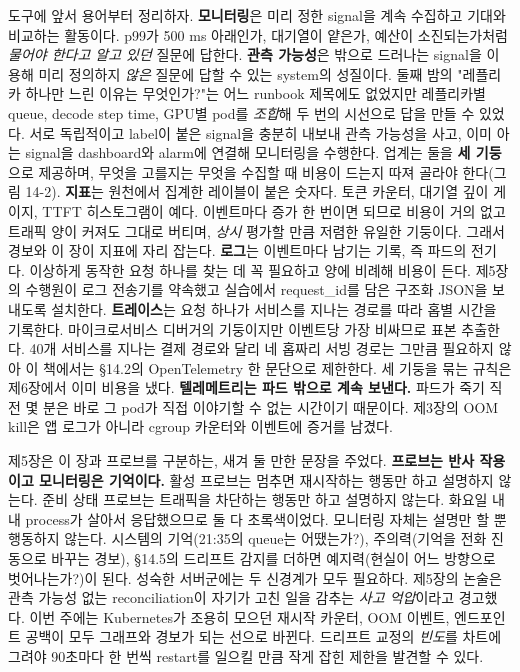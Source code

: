 도구에 앞서 용어부터 정리하자. \textbf{모니터링}은 미리 정한 signal을 계속 수집하고 기대와 비교하는 활동이다. p99가 500 ms 아래인가, 대기열이 얕은가, 예산이 소진되는가처럼 \textit{물어야 한다고 알고 있던} 질문에 답한다. \textbf{관측 가능성}은 밖으로 드러나는 signal을 이용해 미리 정의하지 \textit{않은} 질문에 답할 수 있는 system의 성질이다. 둘째 밤의 "레플리카 하나만 느린 이유는 무엇인가?"는 어느 runbook 제목에도 없었지만 레플리카별 queue, decode step time, GPU별 pod를 \textit{조합}해 두 번의 시선으로 답을 만들 수 있었다. 서로 독립적이고 label이 붙은 signal을 충분히 내보내 관측 가능성을 사고, 이미 아는 signal을 dashboard와 alarm에 연결해 모니터링을 수행한다. 업계는 둘을 \textbf{세 기둥}으로 제공하며, 무엇을 고를지는 무엇을 수집할 때 비용이 드는지 따져 골라야 한다(그림 14-2). \textbf{지표}는 원천에서 집계한 레이블이 붙은 숫자다. 토큰 카운터, 대기열 깊이 게이지, TTFT 히스토그램이 예다. 이벤트마다 증가 한 번이면 되므로 비용이 거의 없고 트래픽 양이 커져도 그대로 버티며, \textit{상시} 평가할 만큼 저렴한 유일한 기둥이다. 그래서 경보와 이 장이 지표에 자리 잡는다. \textbf{로그}는 이벤트마다 남기는 기록, 즉 파드의 전기다. 이상하게 동작한 요청 하나를 찾는 데 꼭 필요하고 양에 비례해 비용이 든다. 제5장의 수행원이 로그 전송기를 약속했고 실습에서 request\_id를 담은 구조화 JSON을 보내도록 설치한다. \textbf{트레이스}는 요청 하나가 서비스를 지나는 경로를 따라 홉별 시간을 기록한다. 마이크로서비스 디버거의 기둥이지만 이벤트당 가장 비싸므로 표본 추출한다. 40개 서비스를 지나는 결제 경로와 달리 네 홉짜리 서빙 경로는 그만큼 필요하지 않아 이 책에서는 §14.2의 OpenTelemetry 한 문단으로 제한한다. 세 기둥을 묶는 규칙은 제6장에서 이미 비용을 냈다. \textbf{텔레메트리는 파드 밖으로 계속 보낸다.} 파드가 죽기 직전 몇 분은 바로 그 pod가 직접 이야기할 수 없는 시간이기 때문이다. 제3장의 OOM kill은 앱 로그가 아니라 cgroup 카운터와 이벤트에 증거를 남겼다.

제5장은 이 장과 프로브를 구분하는, 새겨 둘 만한 문장을 주었다. \textbf{프로브는 반사 작용이고 모니터링은 기억이다.} 활성 프로브는 멈추면 재시작하는 행동만 하고 설명하지 않는다. 준비 상태 프로브는 트래픽을 차단하는 행동만 하고 설명하지 않는다. 화요일 내내 process가 살아서 응답했으므로 둘 다 초록색이었다. 모니터링 자체는 설명만 할 뿐 행동하지 않는다. 시스템의 기억(21:35의 queue는 어땠는가?), 주의력(기억을 전화 진동으로 바꾸는 경보), §14.5의 드리프트 감지를 더하면 예지력(현실이 어느 방향으로 벗어나는가?)이 된다. 성숙한 서버군에는 두 신경계가 모두 필요하다. 제5장의 논술은 관측 가능성 없는 reconciliation이 자기가 고친 일을 감추는 \textit{사고 억압}이라고 경고했다. 이번 주에는 Kubernetes가 조용히 모으던 재시작 카운터, OOM 이벤트, 엔드포인트 공백이 모두 그래프와 경보가 되는 선으로 바뀐다. 드리프트 교정의 \textit{빈도}를 차트에 그려야 90초마다 한 번씩 restart를 일으킬 만큼 작게 잡힌 제한을 발견할 수 있다.

